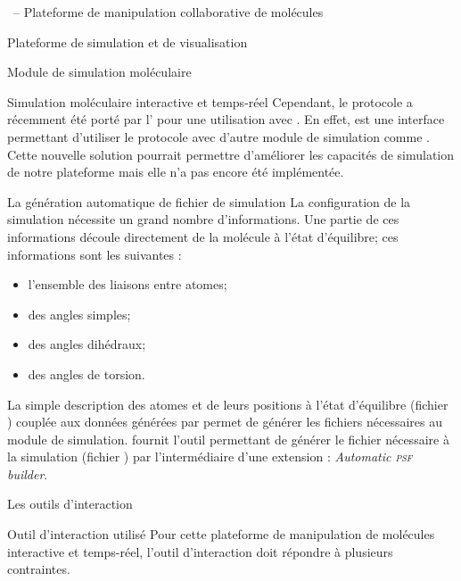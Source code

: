 \documentclass[myfrancais,ngerman,english,frenchb]{mythesis}
\begin{document}
\begin{mychapter}{\myShaddock\ -- Plateforme de manipulation collaborative de molécules}
\begin{mysection}{Plateforme de simulation et de visualisation}
\begin{mysubsection}{Module de simulation moléculaire}
\begin{mysubsubsection}{Simulation moléculaire interactive et temps-réel}
					Cependant, le protocole  a récemment été porté par l' pour une utilisation avec \myGromacs.
					En effet, \myMDDriver {} est une interface permettant d'utiliser le protocole  avec d'autre module de simulation comme \myGromacs.
					Cette nouvelle solution pourrait permettre d'améliorer les capacités de simulation de notre plateforme mais elle n'a pas encore été implémentée.
				\end{mysubsubsection}
				\begin{mysubsubsection}{La génération automatique de fichier de simulation}
					La configuration de la simulation nécessite un grand nombre d'informations.
					Une partie de ces informations découle directement de la molécule à l'état d'équilibre; ces informations sont les suivantes :
					\begin{itemize}
						\item l'ensemble des liaisons entre atomes;
						\item des angles simples;
						\item des angles dihédraux;
						\item des angles de torsion.
					\end{itemize}
					La simple description des atomes et de leurs positions à l'état d'équilibre (fichier \myPDB) couplée aux données générées par \myCHARMM {} permet de générer les fichiers nécessaires au module de simulation.
					 fournit l'outil permettant de générer le fichier nécessaire à la simulation (fichier \myPSF) par l'intermédiaire d'une extension : \textit{Automatic \textsc{psf} builder}.
				\end{mysubsubsection}
			\end{mysubsection}
		\end{mysection}
		\begin{mysection}{Les outils d'interaction}
			\begin{mysubsection}{Outil d'interaction utilisé}
				Pour cette plateforme de manipulation de molécules interactive et temps-réel, l'outil d'interaction doit répondre à plusieurs contraintes.


\end{mysubsection}
\end{mysection}
\end{mychapter}
\end{document}
